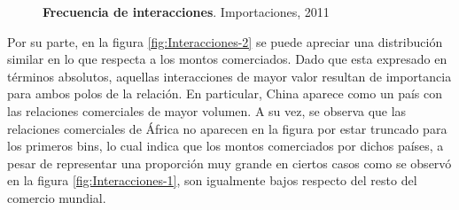 \documentclass[runningheads,a4paper]{llncs}
\begin{document}
\begin{figure}[]
\centering
{}
\caption{\textbf{Frecuencia de interacciones}. Importaciones, 2011}
\label{fig:Interacciones}
\end{figure}




Por su parte, en la figura \ref{fig:Interacciones-2} se puede apreciar una distribución similar en lo que respecta a los montos comerciados. Dado que esta expresado en términos absolutos, aquellas interacciones de mayor valor resultan de importancia para ambos polos de la relación. En particular, China aparece como un país con las relaciones comerciales de mayor volumen. A su vez, se observa que las relaciones comerciales de África no aparecen en la figura por estar truncado para los primeros bins, lo cual indica que los montos comerciados por dichos países, a pesar de representar una proporción muy grande en ciertos casos como se observó en la figura \ref{fig:Interacciones-1}, son igualmente bajos respecto del resto del comercio mundial.
\end{document}
